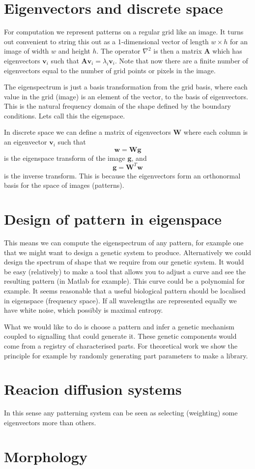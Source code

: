 \documentclass{report}
\renewcommand{\vec}[1]{\mathbf{#1}}
\newcommand{\mat}{\mathbf}
\begin{document}
\section{Eigenvectors and discrete space}
For computation we represent patterns on a regular grid like an image. It turns
out convenient to string this out as a 1-dimensional vector of length $w\times
h$ for an image of width $w$ and height $h$. The operator $\nabla^2$ is then a
matrix $\mat{A}$ which has eigenvectors $\vec{v}_i$ such that $\mat{A}\vec{v}_i
= \lambda_i \vec{v}_i$. Note that now there are a finite number of eigenvectors
equal to the number of grid points or pixels in the image.

The eigenspectrum is just a basis transformation from the grid basis, where each
value in the grid (image) is an element of the vector, to the basis of
eigenvectors. This is the natural frequency domain of the shape defined by the
boundary conditions. Lets call this the eigenspace.

In discrete space we can define a matrix of eigenvectors
$\mat{W}$ where each column is an eigenvector $\vec{v}_i$ such that
\begin{equation}
\vec{w} = \mat{W}\vec{g}
\end{equation}
is the eigenspace transform of the image $\vec{g}$, and
\begin{equation}
\vec{g} = \mat{W}^T\vec{w}
\end{equation}
is the inverse transform. This is because the eigenvectors form an orthonormal
basis for the space of images (patterns).

\section{Design of pattern in eigenspace}
This means we can compute the eigenspectrum of any pattern, for example one that
we might want to design a genetic system to produce. Alternatively we could
design the spectrum of shape that we require from our genetic system. It would
be easy (relatively) to make a tool that allows you to adjust a curve and see
the resulting pattern (in Matlab for example). This curve could be a polynomial
for example. It seems reasonable that a useful biological pattern should be
localised in eigenspace (frequency space). If all wavelengths are represented
equally we have white noise, which possibly is maximal entropy. 

What we would like to do is choose a pattern and infer a genetic mechanism
coupled to signalling that could generate it. These genetic components would
come from a registry of characterised parts. For theoretical work we show the
principle for example by randomly generating part parameters to make a library.

\section{Reacion diffusion systems}
In this sense any patterning system can be seen as selecting (weighting)
some eigenvectors more than others. 

\section{Morphology }

\section{}
\end{document}

